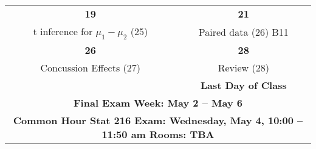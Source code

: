 \begin{center}
\begin{tabular}{|c|c|}
 \hfill\bf{19} & \hfill\bf{21} \\
 t inference for $\mu_1- \mu_2$  \small{(25)} &
 \hfill Paired data \small{(26)}  \hfill  \small{\sf B11}
\\ \hline

 \hfill\bf{26} & \hfill\bf{28} \\
  Concussion Effects \small{(27)}
  & Review    \small{(28)}
\\
  &  \small\bf{ Last Day of Class}  \\ \hline

  \multicolumn{2}{|c|}{\textbf{Final Exam Week: May 2 -- May 6 }} \\
  \multicolumn{2}{|c|}{\bf{ Common Hour Stat 216  Exam: 
      Wednesday, May 4, 10:00 -- 11:50 am Rooms: TBA}} \\
\hline

\end{tabular}
\vspace{.2in} \\
\end{center}


